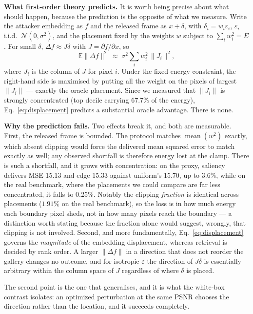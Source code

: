 \documentclass[10pt,journal]{IEEEtran}
\begin{document}
\textbf{What first-order theory predicts.} It is worth being precise about
what should happen, because the prediction is the opposite of what we
measure. Write the attacker embedding as $f$ and the released frame as
$x+\delta$, with $\delta_i = w_i\varepsilon_i$, $\varepsilon_i$ i.i.d.\
$\mathcal{N}(0,\sigma^2)$, and the placement fixed by the weights $w$ subject
to $\sum_i w_i^2 = E$. For small $\delta$, $\Delta f \approx J\delta$ with
$J=\partial f/\partial x$, so
\begin{equation}
\label{eq:displacement}
\mathbb{E}\lVert \Delta f\rVert^2 \;\approx\; \sigma^2 \sum_i w_i^2\,\lVert J_i\rVert^2 ,
\end{equation}
where $J_i$ is the column of $J$ for pixel $i$. Under the fixed-energy
constraint, the right-hand side is maximised by putting all the weight on the
pixels of largest $\lVert J_i\rVert$ --- exactly the oracle placement. Since
we measured that $\lVert J_i\rVert$ is strongly concentrated (top decile
carrying 67.7\% of the energy), Eq.~\eqref{eq:displacement} predicts a
substantial oracle advantage. There is none.

\textbf{Why the prediction fails.} Two effects break it, and both are
measurable. First, the released frame is bounded. The protocol matches
$\operatorname{mean}(w^2)$ exactly, which absent clipping would force the
delivered mean squared error to match exactly as well; any observed shortfall
is therefore energy lost at the clamp. There is such a shortfall, and it grows
with concentration: on the proxy, saliency delivers MSE 15.13 and edge 15.33
against uniform's 15.70, up to 3.6\%, while on the real benchmark, where the
placements we could compare are far less concentrated, it falls to 0.25\%.
Notably the clipping \emph{fraction} is identical across placements
($1.91\%$ on the real benchmark), so the loss is in how much energy each
boundary pixel sheds, not in how many pixels reach the boundary --- a
distinction worth stating because the fraction alone would suggest, wrongly,
that clipping is not involved. Second, and more fundamentally,
Eq.~\eqref{eq:displacement} governs the \emph{magnitude} of the embedding
displacement, whereas retrieval is decided by rank order. A larger
$\lVert\Delta f\rVert$ in a direction that does not reorder the gallery
changes no outcome, and for isotropic $\varepsilon$ the direction of
$J\delta$ is essentially arbitrary within the column space of $J$ regardless
of where $\delta$ is placed.

The second point is the one that generalises, and it is what the white-box
contrast isolates: an optimized perturbation at the same PSNR chooses the
direction rather than the location, and it succeeds completely.
\end{document}
